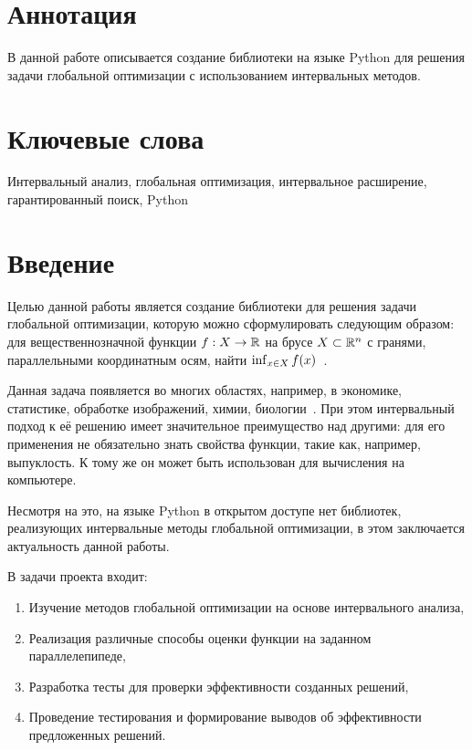 \documentclass[a4paper,12pt]{extarticle}
\let\b\relax
\newcommand{\b}{\mathbf}
\newcommand{\R}{\mathbb{R}}
\begin{document}
\newpage
\setcounter{page}{2}

{
	\hypersetup{linkcolor=black}
	\tableofcontents
}

\newpage

\newpage
\section*{Аннотация}   %
В данной работе описывается создание библиотеки на языке Python для решения задачи глобальной оптимизации с использованием интервальных методов.


\section*{Ключевые слова}
Интервальный анализ, глобальная оптимизация, интервальное расширение, гарантированный поиск, Python
\pagebreak

\section{Введение} 
Целью данной работы является создание библиотеки для решения задачи глобальной оптимизации, которую можно сформулировать следующим образом: для вещественнозначной функции $f : \b{X} \to \R$ на брусе $\b{X} \subset \R^{n}$ с гранями, параллельными координатным осям, найти $\inf_{x \in \b{X}} f(x)$~\cite{interval-analysis-intro}.

Данная задача появляется во многих областях, например, в экономике, статистике, обработке изображений, химии, биологии~\cite{horst2000introduction}. При этом интервальный подход к её решению имеет значительное преимущество над другими: для его применения не обязательно знать свойства функции, такие как, например, выпуклость. К тому же он может быть использован для вычисления на компьютере.

Несмотря на это, на языке Python в открытом доступе нет библиотек, реализующих интервальные методы глобальной оптимизации, в этом заключается актуальность данной работы.

В задачи проекта входит:
\begin{enumerate}
	\item Изучение методов глобальной оптимизации на основе интервального анализа,
	\item Реализация различные способы оценки функции на заданном параллелепипеде,
	\item Разработка тесты для проверки эффективности созданных решений,
	\item Проведение тестирования и формирование выводов об эффективности предложенных решений.
\end{enumerate}
\end{document}
